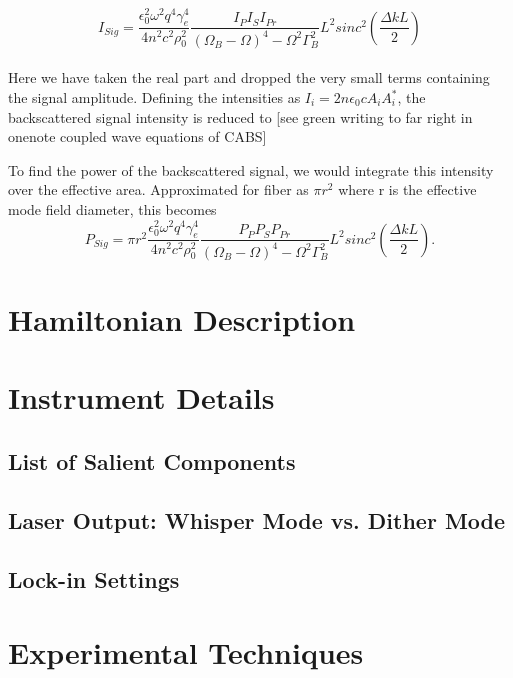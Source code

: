 \documentclass[
sn-nature,
twocolumn
]{sn-jnl}%
\begin{document}
\begin{appendices}
\\
\begin{equation}
  I_{Sig} = \frac{\epsilon_{0}^{2}\omega^{2}q^{4}\gamma_{e}^{4}}{4n^{2}c^{2}\rho_{0}^{2}}\frac{I_{P}I_{S}I_{Pr}}{(\Omega_{B} - \Omega)^{4} - \Omega^{2}\Gamma_{B}^{2}}L^{2}sinc^{2}\left(\frac{\Delta kL}{2}\right)
\end{equation}
\\
Here we have taken the real part and dropped the very small terms containing the signal amplitude. Defining the intensities as $I_{i} = 2n\epsilon_{0}cA_{i}A_{i}^{*}$, the backscattered signal intensity is reduced to [see green writing to far right in onenote coupled wave equations of CABS]

To find the power of the backscattered signal, we would integrate this intensity over the effective area. Approximated for fiber as $\pi r^{2}$ where r is the effective mode field diameter, this becomes
\\
\begin{equation}
  P_{Sig} = \pi r^{2}\frac{\epsilon_{0}^{2}\omega^{2}q^{4}\gamma_{e}^{4}}{4n^{2}c^{2}\rho_{0}^{2}}\frac{P_{P}P_{S}P_{Pr}}{(\Omega_{B} - \Omega)^{4} - \Omega^{2}\Gamma_{B}^{2}}L^{2}sinc^{2}\left(\frac{\Delta kL}{2}\right).
\end{equation}
\newpage

\section{Hamiltonian Description}

\section{Instrument Details}
\subsection{List of Salient Components}
\subsection{Laser Output: Whisper Mode vs. Dither Mode}
\subsection{Lock-in Settings}

\section{Experimental Techniques}

\end{appendices}
\end{document}
